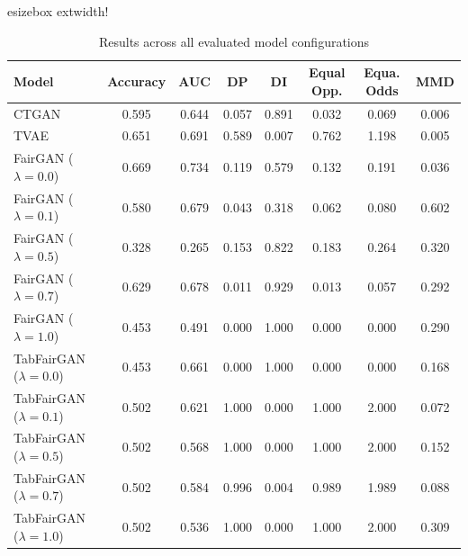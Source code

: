\begin{table}[h!]
\label{tab:results-all}
\centering

esizebox{	extwidth}{!}{
\begin{tabular}{lccccccc}
\toprule
Model & Accuracy & AUC & DP & DI & Equal Opp. & Equa. Odds & MMD \\
\midrule
CTGAN & 0.595 & 0.644 & 0.057 & 0.891 & 0.032 & 0.069 & 0.006 \\
TVAE & 0.651 & 0.691 & 0.589 & 0.007 & 0.762 & 1.198 & 0.005 \\
FairGAN ($\lambda=0.0$) & 0.669 & 0.734 & 0.119 & 0.579 & 0.132 & 0.191 & 0.036 \\
FairGAN ($\lambda=0.1$) & 0.580 & 0.679 & 0.043 & 0.318 & 0.062 & 0.080 & 0.602 \\
FairGAN ($\lambda=0.5$) & 0.328 & 0.265 & 0.153 & 0.822 & 0.183 & 0.264 & 0.320 \\
FairGAN ($\lambda=0.7$) & 0.629 & 0.678 & 0.011 & 0.929 & 0.013 & 0.057 & 0.292 \\
FairGAN ($\lambda=1.0$) & 0.453 & 0.491 & 0.000 & 1.000 & 0.000 & 0.000 & 0.290 \\
TabFairGAN ($\lambda=0.0$) & 0.453 & 0.661 & 0.000 & 1.000 & 0.000 & 0.000 & 0.168 \\
TabFairGAN ($\lambda=0.1$) & 0.502 & 0.621 & 1.000 & 0.000 & 1.000 & 2.000 & 0.072 \\
TabFairGAN ($\lambda=0.5$) & 0.502 & 0.568 & 1.000 & 0.000 & 1.000 & 2.000 & 0.152 \\
TabFairGAN ($\lambda=0.7$) & 0.502 & 0.584 & 0.996 & 0.004 & 0.989 & 1.989 & 0.088 \\
TabFairGAN ($\lambda=1.0$) & 0.502 & 0.536 & 1.000 & 0.000 & 1.000 & 2.000 & 0.309 \\
\bottomrule
\end{tabular}
}
\caption{Results across all evaluated model configurations}
\end{table}
